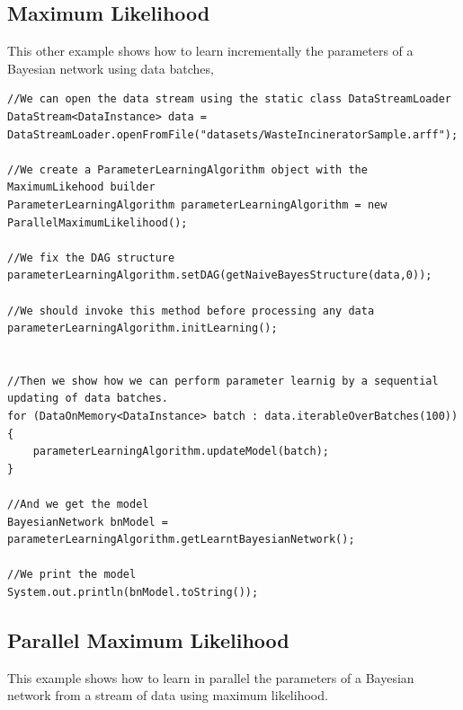 \subsection{Maximum Likelihood}

This other example shows how to learn incrementally the parameters of a Bayesian network using data batches,
\begin{lstlisting}
//We can open the data stream using the static class DataStreamLoader
DataStream<DataInstance> data = DataStreamLoader.openFromFile("datasets/WasteIncineratorSample.arff");

//We create a ParameterLearningAlgorithm object with the MaximumLikehood builder
ParameterLearningAlgorithm parameterLearningAlgorithm = new ParallelMaximumLikelihood();

//We fix the DAG structure
parameterLearningAlgorithm.setDAG(getNaiveBayesStructure(data,0));

//We should invoke this method before processing any data
parameterLearningAlgorithm.initLearning();


//Then we show how we can perform parameter learnig by a sequential updating of data batches.
for (DataOnMemory<DataInstance> batch : data.iterableOverBatches(100)){
    parameterLearningAlgorithm.updateModel(batch);
}

//And we get the model
BayesianNetwork bnModel = parameterLearningAlgorithm.getLearntBayesianNetwork();

//We print the model
System.out.println(bnModel.toString());
\end{lstlisting}

\subsection{Parallel Maximum Likelihood}

This example shows how to learn in parallel the parameters of a Bayesian network from a stream of data using maximum likelihood.

